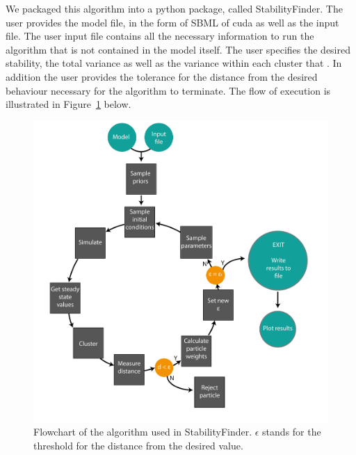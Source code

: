 We packaged this algorithm into a python package, called StabilityFinder.  The user provides the model file, in the form of SBML of cuda as well as the input file. The user input file contains all the necessary information to run the algorithm that is not contained in the model itself. The user specifies the desired stability, the total variance as well as the variance within each cluster that . In addition the user provides the tolerance for the distance from the desired behaviour necessary for the algorithm to terminate. The flow of execution is illustrated in Figure~\ref{fig:flowchart} below.

\clearpage
\begin{figure}[htbp]
	\centering
	\includegraphics[scale=0.6]{chapterStabilityFinder/images/StabilityChecker_flowchart-01}
	\caption[Flowchart of the algorithm used in StabilityFinder]{Flowchart of the algorithm used in StabilityFinder. $\epsilon$ stands for the threshold for the distance from the desired value.}
	\label{fig:flowchart}
\end{figure}
\clearpage
 
